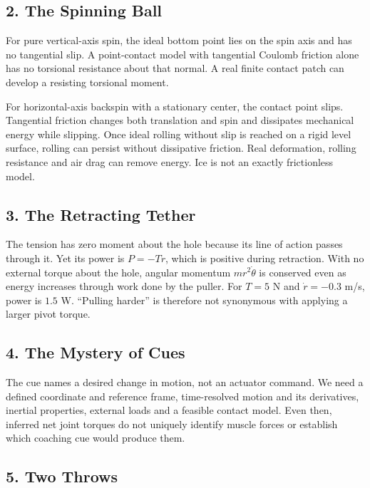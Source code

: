 \subsection*{2. The Spinning Ball}\label{ch01:the-spinning-ball}

For pure vertical-axis spin, the ideal bottom point lies on the spin axis and has no tangential slip. A point-contact model with tangential Coulomb friction alone has no torsional resistance about that normal. A real finite contact patch can develop a resisting torsional moment.

For horizontal-axis backspin with a stationary center, the contact point slips. Tangential friction changes both translation and spin and dissipates mechanical energy while slipping. Once ideal rolling without slip is reached on a rigid level surface, rolling can persist without dissipative friction. Real deformation, rolling resistance and air drag can remove energy. Ice is not an exactly frictionless model.

\subsection*{3. The Retracting Tether}\label{ch01:the-retracting-tether}

The tension has zero moment about the hole because its line of action passes through it. Yet its power is \(P=-T\dot r\), which is positive during retraction. With no external torque about the hole, angular momentum \(mr^2\dot\theta\) is conserved even as energy increases through work done by the puller. For \(T=5\) N and \(\dot r=-0.3\) m/s, power is \(1.5\) W. ``Pulling harder'' is therefore not synonymous with applying a larger pivot torque.

\subsection*{4. The Mystery of Cues}\label{ch01:the-mystery-of-cues}

The cue names a desired change in motion, not an actuator command. We need a defined coordinate and reference frame, time-resolved motion and its derivatives, inertial properties, external loads and a feasible contact model. Even then, inferred net joint torques do not uniquely identify muscle forces or establish which coaching cue would produce them.

\subsection*{5. Two Throws}\label{ch01:two-throws}

